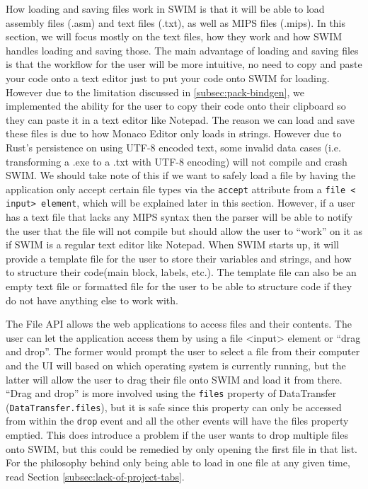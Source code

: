 \documentclass[
    paper=letter,
    parskip=half,
    fontsize=12pt,
    titlepage=firstiscover,
    toc=bibliography,
    numbers=endperiod
]{scrartcl}
\begin{document}
How loading and saving files work in SWIM is that it will be able to
load assembly files (.asm) and text files (.txt), as well as MIPS files
(.mips). In this section, we will focus mostly on the text files, how
they work and how SWIM handles loading and saving those. The main
advantage of loading and saving files is that the workflow for the user
will be more intuitive, no need to copy and paste your code onto a text
editor just to put your code onto SWIM for loading. However due to the
limitation discussed in \ref{subsec:pack-bindgen}, we implemented the
ability for the user to copy their code onto their clipboard so they can
paste it in a text editor like Notepad. The reason we can load and save
these files is due to how Monaco Editor only loads in strings. However
due to Rust's persistence on using UTF-8 encoded text, some invalid data
cases (i.e. transforming a .exe to a .txt with UTF-8 encoding) will not
compile and crash SWIM. We should take note of this if we want to safely
load a file by having the application only accept certain file types via
the \texttt{accept} attribute from a \texttt{file \textless
    input\textgreater{} element}, which will be explained later in this
section. However, if a user has a text file that lacks any MIPS syntax
then the parser will be able to notify the user that the file will not
compile but should allow the user to ``work'' on it as if SWIM is a
regular text editor like Notepad. When SWIM starts up, it will provide a
template file for the user to store their variables and strings, and how
to structure their code(main block, labels, etc.). The template file can
also be an empty text file or formatted file for the user to be able to
structure code if they do not have anything else to work with.

The File API \cite{mdn-file-api} allows the web applications to access
files and their contents. The user can let the application access them
by using a file \textless input\textgreater{} element or ``drag and
drop''. The former would prompt the user to select a file from their
computer and the UI will based on which operating system is currently
running, but the latter will allow the user to drag their file onto SWIM
and load it from there. ``Drag and drop'' is more involved using the
\texttt{files} property of DataTransfer (\texttt{DataTransfer.files}),
but it is safe since this property can only be accessed from within the
\texttt{drop} event and all the other events will have the files
property emptied. This does introduce a problem if the user wants to
drop multiple files onto SWIM, but this could be remedied by only
opening the first file in that list. For the philosophy behind only
being able to load in one file at any given time, read Section
\ref{subsec:lack-of-project-tabs}.
\end{document}
